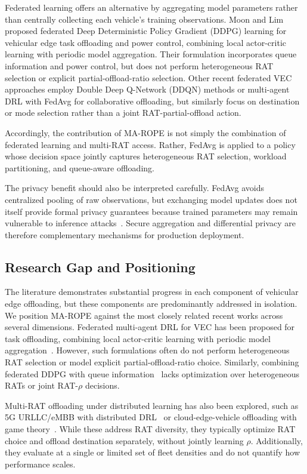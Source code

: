 \documentclass[journal,10pt,twocolumn]{IEEEtran}
\begin{document}
Federated learning offers an alternative by aggregating model parameters rather than centrally collecting each vehicle's training observations. Moon and Lim~\cite{moonlim2022} proposed federated Deep Deterministic Policy Gradient (DDPG) learning for vehicular edge task offloading and power control, combining local actor-critic learning with periodic model aggregation. Their formulation incorporates queue information and power control, but does not perform heterogeneous RAT selection or explicit partial-offload-ratio selection. Other recent federated VEC approaches employ Double Deep Q-Network (DDQN) methods or multi-agent DRL with FedAvg for collaborative offloading, but similarly focus on destination or mode selection rather than a joint RAT-partial-offload action.

Accordingly, the contribution of MA-ROPE is not simply the combination of federated learning and multi-RAT access. Rather, FedAvg is applied to a policy whose decision space jointly captures heterogeneous RAT selection, workload partitioning, and queue-aware offloading.

The privacy benefit should also be interpreted carefully. FedAvg avoids centralized pooling of raw observations, but exchanging model updates does not itself provide formal privacy guarantees because trained parameters may remain vulnerable to inference attacks~\cite{zhu2019}. Secure aggregation and differential privacy are therefore complementary mechanisms for production deployment.

\subsection{Research Gap and Positioning}

The literature demonstrates substantial progress in each component of vehicular edge offloading, but these components are predominantly addressed in isolation. We position MA-ROPE against the most closely related recent works across several dimensions. Federated multi-agent DRL for VEC has been proposed for task offloading, combining local actor-critic learning with periodic model aggregation~\cite{zhao2024}. However, such formulations often do not perform heterogeneous RAT selection or model explicit partial-offload-ratio choice. Similarly, combining federated DDPG with queue information~\cite{moonlim2022} lacks optimization over heterogeneous RATs or joint RAT-$\rho$ decisions.

Multi-RAT offloading under distributed learning has also been explored, such as 5G URLLC/eMBB with distributed DRL~\cite{yun2022} or cloud-edge-vehicle offloading with game theory~\cite{guo2026}. While these address RAT diversity, they typically optimize RAT choice and offload destination separately, without jointly learning $\rho$. Additionally, they evaluate at a single or limited set of fleet densities and do not quantify how performance scales.
\end{document}
